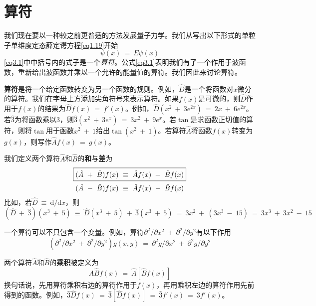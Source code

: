 \documentclass[12pt,a4paper,openany]{ctexbook}
\begin{document}
\section{算符}
\begin{flushleft}
    \setlength{\parindent}{2em}
我们现在要以一种较之前更普适的方法发展量子力学。我们从写出以下形式的单粒子单维度定态薛定谔方程\eqref{eq1.19}开始
\begin{equation}
    [-\frac{\hbar^2}{2m}\frac{\mathrm{d}^2}{\mathrm{d}x^2}\ +\ V(x)]\psi(x)\ =\ E\psi(x)
    \label{eq3.1}
\end{equation}
\eqref{eq3.1}中中括号内的式子是一个\textit{算符}。公式\eqref{eq3.1}表明我们有了一个作用于波函数，重新给出波函数并乘以一个允许的能量值的算符。我们因此来讨论算符。

\textbf{算符}是将一个给定函数转变为另一个函数的规则。例如，$\hat{D}$是一个将函数对$x$微分的算符。我们在字母上方添加尖角符号$\hat{}$来表示算符。如果$f(x)$是可微的，则$\hat{D}$作用于$f(x)$的结果为$\hat{D}f(x)\ =\ f'(x)$。例如，$\hat{D}(x^2\ +\ 3e^{2x})\ =\ 2x\ +\ 6e^{2x}$。若$\hat{3}$为将函数乘以3，则$\hat{3}(x^2\ +\ 3e^x)\ =\ 3x^2\ +\ 9e^x$。若$\tan$是求函数正切值的算符，则将$\tan$用于函数$x^2\ +\ 1$给出$\tan(x^2\ +\ 1)$。若算符$\hat{A}$将函数$f(x)$转变为$g(x)$，则写作$\hat{A}f(x)\ =\ g(x)$。

我们定义两个算符$\hat{A}$和$\hat{B}$的\textbf{和}与\textbf{差}为
\begin{gather}
    \boxed{(\hat{A}\ +\ \hat{B})f(x)\ \equiv\ \hat{A}f(x)\ +\ \hat{B}f(x)} \label{eq3.2} \\
    (\hat{A}\ -\ \hat{B})f(x)\ \equiv\ \hat{A}f(x)\ -\ \hat{B}f(x) \notag
\end{gather}
比如，若$\hat{D}\ \equiv\ \mathrm{d}/\mathrm{d}x$，则
\begin{equation*}
    (\hat{D}\ +\ \hat{3})(x^3\ +\ 5)\ \equiv\ \hat{D}(x^3\ +\ 5)\ +\ \hat{3}(x^3\ +\ 5)\ =\ 3x^2\ +\ (3x^3\ -\ 15)\ =\ 3x^3\ +\ 3x^2\ -\ 15
\end{equation*}

一个算符可以不只包含一个变量。例如，算符$\partial^2/\partial x^2\ +\ \partial^2/\partial y^2$有以下作用
\begin{equation*}
    (\partial^2/\partial x^2\ +\ \partial^2/\partial y^2)g(x,y)\ =\ \partial^2g/\partial x^2\ +\ \partial^2g/\partial y^2
\end{equation*}

两个算符$\hat{A}$和$\hat{B}$的\textbf{乘积}被定义为
\begin{equation}
    \boxed{\hat{A}\hat{B}f(x)\ =\ \hat{A}[\hat{B}f(x)]}
    \label{eq3.3}
\end{equation}
换句话说，先用算符乘积右边的算符作用于$f(x)$，再用乘积左边的算符作用先前得到的函数。例如，$\hat{3}\hat{D}f(x)\ =\ \hat{3}[\hat{D}f(x)]\ =\ \hat{3}f'(x)\ =\ 3f'(x)$。


\end{flushleft}
\end{document}
